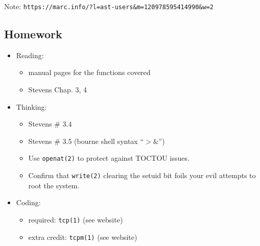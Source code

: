 \documentclass[xga]{xdvislides}
\begin{document}
Note:
{\tt https://marc.info/?l=ast-users\&m=120978595414990\&w=2}


\subsection{Homework}
\begin{itemize}
	\item Reading:
		\begin{itemize}
			\item manual pages for the functions covered
			\item Stevens Chap. 3, 4
		\end{itemize}
	\item Thinking:
		\begin{itemize}
			\item Stevens \# 3.4
			\item Stevens \# 3.5 (bourne shell syntax ``$>\&$'')
			\item Use {\tt openat(2)} to protect against TOCTOU issues.
			\item Confirm that {\tt write(2)} clearing the setuid bit foils your evil attempts to root the system.
		\end{itemize}
	\item Coding:
		\begin{itemize}
			\item required: {\tt tcp(1)} (see website)
			\item extra credit: {\tt tcpm(1)} (see website)
		\end{itemize}
\end{itemize}
\end{document}
